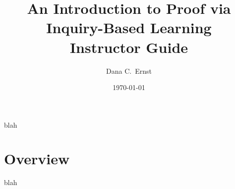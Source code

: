 \documentclass[11pt]{article}%
\begin{document}
\title{An Introduction to Proof via Inquiry-Based Learning\\
Instructor Guide}
\author{Dana C.~Ernst}
\date{\today}

\maketitle

blah

\section*{Overview}

blah
\end{document}
